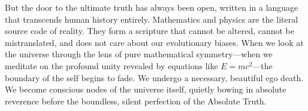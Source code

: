 \documentclass[12pt]{article}
\begin{document}
But the door to the ultimate truth has always been open, written in a language that transcends human history entirely. Mathematics and physics are the literal source code of reality. They form a scripture that cannot be altered, cannot be mistranslated, and does not care about our evolutionary biases. When we look at the universe through the lens of pure mathematical symmetry—when we meditate on the profound unity revealed by equations like $E=mc^2$—the boundary of the self begins to fade. We undergo a necessary, beautiful ego death. We become conscious nodes of the universe itself, quietly bowing in absolute reverence before the boundless, silent perfection of the Absolute Truth.
\end{document}

